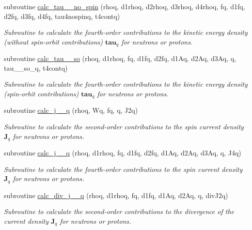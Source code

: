 \begin{DoxyCompactItemize}
subroutine \mbox{\hyperlink{namespaceroutines_a9c7e02754e0ae8816b1bfeab92df6bc8}{calc\+\_\+tau\+\_\+\_\+no\+\_\+spin}} (rhoq, d1rhoq, d2rhoq, d3rhoq, d4rhoq, fq, d1fq, d2fq, d3fq, d4fq, tau4nospinq, t4contq)
\begin{DoxyCompactList}\small\item\em Subroutine to calculate the fourth-\/order contributions to the kinetic energy density (without spin-\/orbit contributions) $\textbf{tau}_q$ for neutrons or protons. \end{DoxyCompactList}\item 
subroutine \mbox{\hyperlink{namespaceroutines_a8825f02bb2ac98507fff5024d9b54c8f}{calc\+\_\+tau\+\_\+\_\+so}} (rhoq, d1rhoq, fq, d1fq, d2fq, d1\+Aq, d2\+Aq, d3\+Aq, q, tau\+\_\+\_\+so\+\_\+q, t4contq)
\begin{DoxyCompactList}\small\item\em Subroutine to calculate the fourth-\/order contributions to the kinetic energy density (spin-\/orbit contributions) $\textbf{tau}_q$ for neutrons or protons. \end{DoxyCompactList}\item 
subroutine \mbox{\hyperlink{namespaceroutines_af03f37f9deca52ef9a56287f50b982a1}{calc\+\_\+j\+\_\+\_\+q}} (rhoq, Wq, fq, q, J2q)
\begin{DoxyCompactList}\small\item\em Subroutine to calculate the second-\/order contributions to the spin current density $\textbf{J}_q$ for neutrons or protons. \end{DoxyCompactList}\item 
subroutine \mbox{\hyperlink{namespaceroutines_a014fed5fe5fbc19302e7cbc651ba59bd}{calc\+\_\+j\+\_\+\_\+q}} (rhoq, d1rhoq, fq, d1fq, d2fq, d1\+Aq, d2\+Aq, d3\+Aq, q, J4q)
\begin{DoxyCompactList}\small\item\em Subroutine to calculate the fourth-\/order contributions to the spin current density $\textbf{J}_q$ for neutrons or protons. \end{DoxyCompactList}\item 
subroutine \mbox{\hyperlink{namespaceroutines_a136b7a1f0387466390decb98ce91c152}{calc\+\_\+div\+\_\+j\+\_\+\_\+q}} (rhoq, d1rhoq, fq, d1fq, d1\+Aq, d2\+Aq, q, div\+J2q)
\begin{DoxyCompactList}\small\item\em Subroutine to calculate the second-\/order contributions to the divergence of the current density $\textbf{J}_q$ for neutrons or protons. \end{DoxyCompactList}\item 

\end{DoxyCompactItemize}

